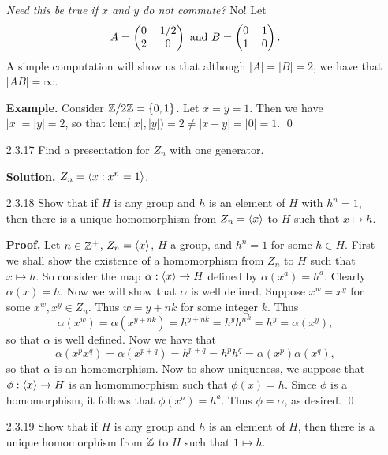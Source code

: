 \begin{enumerate}
      \textit{Need this be true if $x$ and $y$ do not commute?} No! Let
      $$
         A = \left(\begin{tabular}{@{}cc@{}}
            0 & 1/2 \\
            2 & 0
         \end{tabular}\right) \text{ and }
         B = \left(\begin{tabular}{@{}cc@{}}
            0 & 1 \\
            1 & 0
         \end{tabular}\right).
      $$
      A simple computation will show us that although $|A| = |B| = 2$, we have
      that $|AB| = \infty$.
      
      \textbf{Example.} Consider $\mathbb{Z}/2\mathbb{Z} = \{0, 1\}$. Let $x = y = 1$. Then we
      have $|x| = |y| = 2$, so that lcm($|x|, |y|) = 2 \neq |x + y| = |0| = 1$.
      \qed
   \item[2.3.17]  Find a presentation for $Z_n$ with one generator.
   
      \textbf{Solution.} $Z_n = \langle x : x^n = 1 \rangle$.
   \item[2.3.18]  Show that if $H$ is any group and $h$ is an element of $H$
                  with $h^n = 1$, then there is a unique homomorphism from
                  $Z_n = \langle x \rangle$ to $H$ such that $x \mapsto h$.
                  
      \textbf{Proof.} Let $n \in \mathbb{Z}^+$, $Z_n = \langle x \rangle$, $H$ a group, and
      $h^n  = 1$ for some $h \in H$. First we shall show the existence of a
      homomorphism from $Z_n$ to $H$ such that $x \mapsto h$. So consider the
      map $\alpha : \langle x \rangle \rightarrow H$ defined by $\alpha(x^a) = h^a$.
      Clearly $\alpha(x) = h$. Now we will show that $\alpha$ is well defined.
      Suppose $x^w = x^y$ for some $x^w, x^y \in Z_n$. Thus $w = y + nk$ for
      some integer $k$. Thus
      $$\alpha(x^w) = \alpha(x^{y+nk})=h^{y+nk}=h^{y}{h^n}^k =h^y=\alpha(x^y),$$
      so that $\alpha$ is well defined. Now we have that
      $$\alpha(x^px^q)=\alpha(x^{p+q})=h^{p+q}=h^ph^q=\alpha(x^p)\alpha(x^q),$$
      so that $\alpha$ is an homomorphism. Now to show uniqueness, we suppose
      that $\phi : \langle x \rangle \rightarrow H$ is an homommorphism such that
      $\phi(x) = h$. Since $\phi$ is a homomorphism, it follows that
      $\phi(x^a) = h^a$. Thus $\phi = \alpha$, as desired. \qed
   \item[2.3.19]  Show that if $H$ is any group and $h$ is an element of $H$,
                  then there is a unique homomorphism from $\mathbb{Z}$ to $H$ such that
                  $1 \mapsto h$.
                  

\end{enumerate}
